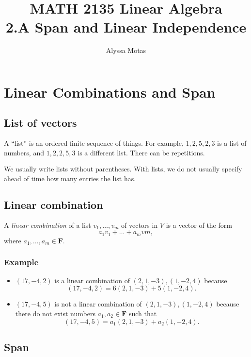 \documentclass[11pt]{article}
\title{\textbf{MATH 2135 Linear Algebra} \\ 2.A Span and Linear Independence}
\author{Alyssa Motas}
\begin{document}
    \maketitle

    \pagebreak

    \tableofcontents

    \pagebreak

    \section{Linear Combinations and Span}

    \subsection{List of vectors}

    A ``list'' is an ordered finite sequence of things. For example, \(1,2,5,2,3\) is a list of numbers, and \(1,2,2,5,3\) is a different list. There can be repetitions. 

    We usually write lists without parentheses. With lists, we do not usually specify ahead of time how many entries the list has. 

    \subsection{Linear combination}

    A \emph{linear combination} of a list \(v_1, \dots, v_m\) of vectors in $V$ is a vector of the form \[a_1 v_1 + \dots + a_m vm,\] where \(a_1, \dots, a_m \in \textbf{F}\).

    \subsubsection{Example}

    \begin{itemize}
        \item \((17,-4,2)\) is a linear combination of \((2,1,-3), (1,-2,4)\) because \[(17,-4,2) = 6(2,1,-3) + 5(1,-2,4).\]
        \item \((17,-4,5)\) is not a linear combination of \((2,1,-3), (1,-2,4)\) because there do not exist numbers \(a_1, a_2 \in \textbf{F}\) such that \[(17,-4,5) = a_1(2,1,-3) + a_2 (1,-2,4). \]
    \end{itemize}

    \subsection{Span}
\end{document}
